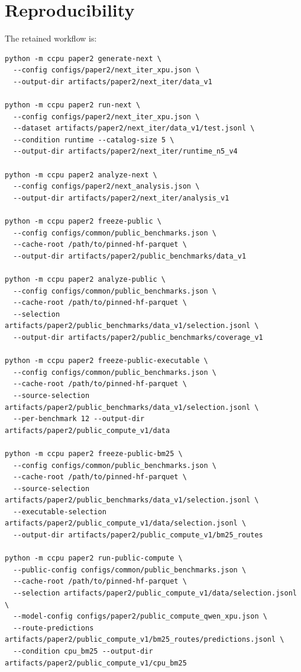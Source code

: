 \documentclass[10pt]{article}
\begin{document}
\section{Reproducibility}

The retained workflow is:

\begin{verbatim}
python -m ccpu paper2 generate-next \
  --config configs/paper2/next_iter_xpu.json \
  --output-dir artifacts/paper2/next_iter/data_v1

python -m ccpu paper2 run-next \
  --config configs/paper2/next_iter_xpu.json \
  --dataset artifacts/paper2/next_iter/data_v1/test.jsonl \
  --condition runtime --catalog-size 5 \
  --output-dir artifacts/paper2/next_iter/runtime_n5_v4

python -m ccpu paper2 analyze-next \
  --config configs/paper2/next_analysis.json \
  --output-dir artifacts/paper2/next_iter/analysis_v1

python -m ccpu paper2 freeze-public \
  --config configs/common/public_benchmarks.json \
  --cache-root /path/to/pinned-hf-parquet \
  --output-dir artifacts/paper2/public_benchmarks/data_v1

python -m ccpu paper2 analyze-public \
  --config configs/common/public_benchmarks.json \
  --cache-root /path/to/pinned-hf-parquet \
  --selection artifacts/paper2/public_benchmarks/data_v1/selection.jsonl \
  --output-dir artifacts/paper2/public_benchmarks/coverage_v1

python -m ccpu paper2 freeze-public-executable \
  --config configs/common/public_benchmarks.json \
  --cache-root /path/to/pinned-hf-parquet \
  --source-selection artifacts/paper2/public_benchmarks/data_v1/selection.jsonl \
  --per-benchmark 12 --output-dir artifacts/paper2/public_compute_v1/data

python -m ccpu paper2 freeze-public-bm25 \
  --config configs/common/public_benchmarks.json \
  --cache-root /path/to/pinned-hf-parquet \
  --source-selection artifacts/paper2/public_benchmarks/data_v1/selection.jsonl \
  --executable-selection artifacts/paper2/public_compute_v1/data/selection.jsonl \
  --output-dir artifacts/paper2/public_compute_v1/bm25_routes

python -m ccpu paper2 run-public-compute \
  --public-config configs/common/public_benchmarks.json \
  --cache-root /path/to/pinned-hf-parquet \
  --selection artifacts/paper2/public_compute_v1/data/selection.jsonl \
  --model-config configs/paper2/public_compute_qwen_xpu.json \
  --route-predictions artifacts/paper2/public_compute_v1/bm25_routes/predictions.jsonl \
  --condition cpu_bm25 --output-dir artifacts/paper2/public_compute_v1/cpu_bm25


\end{verbatim}
\end{document}
